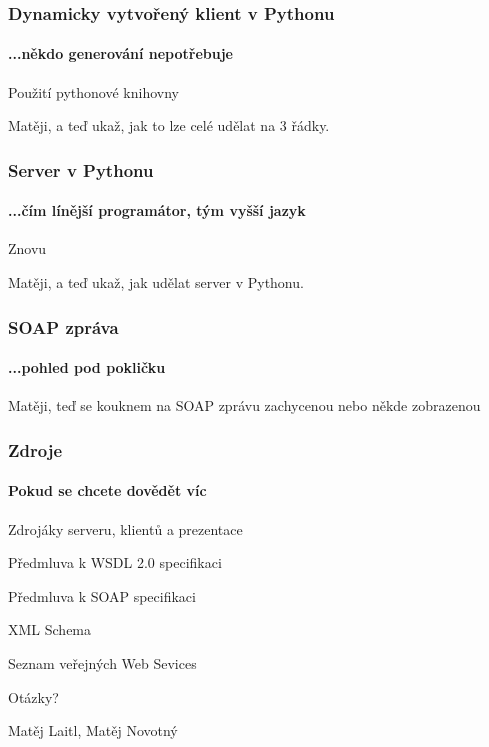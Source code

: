 \documentclass[12pt]{beamer}
\begin{document}
\begin{frame}
  \frametitle{Dynamicky vytvořený klient v Pythonu}
  \framesubtitle{...někdo generování nepotřebuje}
	Použití pythonové knihovny 
  \begin{example}
    Matěji, a teď ukaž, jak to lze celé udělat na 3 řádky.
  \end{example}
\end{frame}

\begin{frame}
  \frametitle{Server v Pythonu}
  \framesubtitle{...čím línější programátor, tým vyšší jazyk}

	Znovu 
  \begin{example}
    Matěji, a teď ukaž, jak udělat server v Pythonu.
  \end{example}
\end{frame}

\begin{frame}
  \frametitle{SOAP zpráva}
  \framesubtitle{...pohled pod pokličku}

  \begin{example}
    Matěji, teď se kouknem na SOAP zprávu zachycenou nebo někde zobrazenou
  \end{example}
\end{frame}

\begin{frame}
  \frametitle{Zdroje}
  \framesubtitle{Pokud se chcete dovědět víc}
  \begin{thebibliography}{10}

  \beamertemplatearticlebibitems

    Zdrojáky serveru, klientů a prezentace

    Předmluva k WSDL 2.0 specifikaci

    Předmluva k SOAP specifikaci

    XML Schema

    Seznam veřejných Web Sevices

  \end{thebibliography}
\end{frame}

\begin{frame}
  \vspace{2cm}
  {\huge Otázky?}

  \vspace{3cm}
  \begin{flushright}
    Matěj Laitl, Matěj Novotný

  \end{flushright}
\end{frame}
\end{document}
